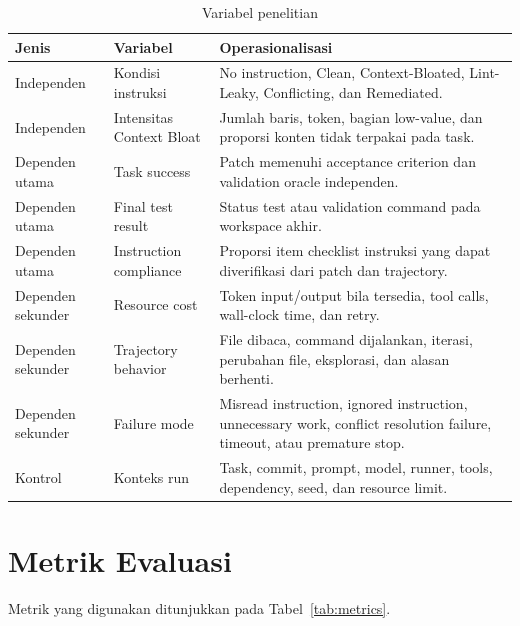 \begin{table}[htbp]
\centering
\small
\renewcommand{\arraystretch}{1.25}
\caption{Variabel penelitian}
\label{tab:variables}
\begin{tabularx}{\textwidth}{p{3.0cm}p{3.7cm}Y}
\toprule
\textbf{Jenis} & \textbf{Variabel} & \textbf{Operasionalisasi} \\
\midrule
Independen & Kondisi instruksi & No instruction, Clean, Context-Bloated, Lint-Leaky, Conflicting, dan Remediated. \\
Independen & Intensitas Context Bloat & Jumlah baris, token, bagian low-value, dan proporsi konten tidak terpakai pada task. \\
Dependen utama & Task success & Patch memenuhi acceptance criterion dan validation oracle independen. \\
Dependen utama & Final test result & Status test atau validation command pada workspace akhir. \\
Dependen utama & Instruction compliance & Proporsi item checklist instruksi yang dapat diverifikasi dari patch dan trajectory. \\
Dependen sekunder & Resource cost & Token input/output bila tersedia, tool calls, wall-clock time, dan retry. \\
Dependen sekunder & Trajectory behavior & File dibaca, command dijalankan, iterasi, perubahan file, eksplorasi, dan alasan berhenti. \\
Dependen sekunder & Failure mode & Misread instruction, ignored instruction, unnecessary work, conflict resolution failure, timeout, atau premature stop. \\
Kontrol & Konteks run & Task, commit, prompt, model, runner, tools, dependency, seed, dan resource limit. \\
\bottomrule
\end{tabularx}
\end{table}

\section{Metrik Evaluasi}

Metrik yang digunakan ditunjukkan pada Tabel~\ref{tab:metrics}.

